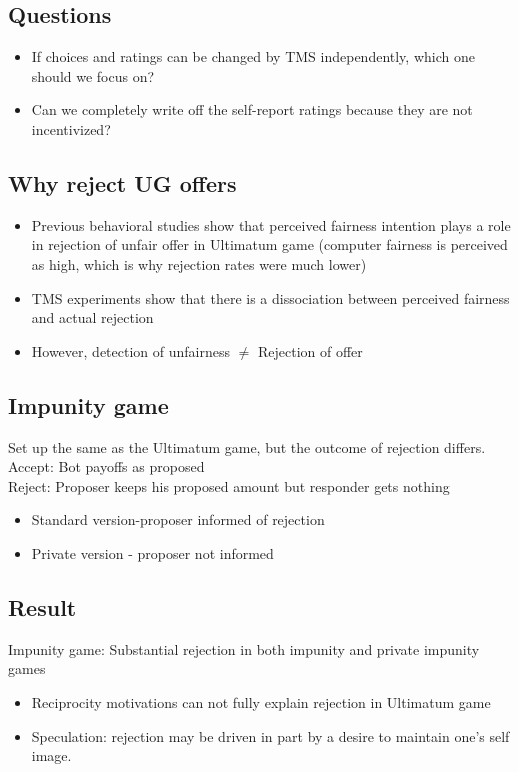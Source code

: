 \subsection{Questions}
\begin{itemize}
    \item If choices and ratings can be changed by TMS independently, which one should we focus on?
    \item Can we completely write off the self-report ratings because they are not incentivized?
\end{itemize}
\subsection{Why reject UG offers}
\begin{itemize}
    \item Previous behavioral studies show that perceived fairness intention plays a role in rejection of unfair offer in Ultimatum game (computer fairness is perceived as high, which is why rejection rates were much lower)
    \item TMS experiments show that there is a dissociation between perceived fairness and actual rejection
    \item However, detection of unfairness $\neq$ Rejection of offer
\end{itemize}
\subsection{Impunity game}
Set up the same as the Ultimatum game, but the outcome of rejection differs.
\\Accept: Bot payoffs as proposed
\\Reject: Proposer keeps his proposed amount but responder gets nothing
\begin{itemize}
    \item Standard version-proposer informed of rejection
    \item Private version - proposer not informed
\end{itemize}
\subsection{Result}
Impunity game: Substantial rejection in both impunity and private impunity games
\begin{itemize}
    \item Reciprocity motivations can not fully explain rejection in Ultimatum game
    \item Speculation: rejection may be driven in part by  a desire to maintain one's self image.
\end{itemize}
